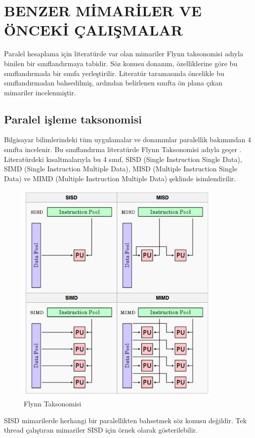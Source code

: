 \chapter{BENZER MİMARİLER VE ÖNCEKİ ÇALIŞMALAR}
Paralel hesaplama için literatürde var olan mimariler Flynn taksonomisi adıyla binilen bir sınıflandırmaya tabidir. Söz konusu donanım, özelliklerine göre bu sınıflandırmada bir sınıfa yerleştirilir. Literatür taramasında öncelikle bu sınıflandırmadan bahsedilmiş, ardından belirlenen sınıfta ön plana çıkan mimariler incelenmiştir.

\section{Paralel işleme taksonomisi}
Bilgisayar bilimlerindeki tüm uygulamalar ve donanımlar paralellik bakımından 4 sınıfta incelenir. Bu sınıflandırma literatürde Flynn Taksonomisi adıyla geçer \cite{flynnTaxonomy}. Literatürdeki kısaltmalarıyla bu 4 sınıf, SISD (Single Instruction Single Data), SIMD (Single Instruction Multiple Data), MISD (Multiple Instruction Single Data) ve MIMD (Multiple Instruction Multiple Data) şeklinde isimlendirilir. 

\begin{figure}[h] \label{image:flynnTaxonomy} 
\centering \includegraphics[width=10cm]{gorsel/flynnTaxonomy.png} \caption{Flynn Taksonomisi}  
\end{figure}

SISD mimarilerde herhangi bir paralellikten bahsetmek söz konusu değildir. Tek thread çalıştıran mimariler SISD için örnek olarak gösterilebilir. \par

